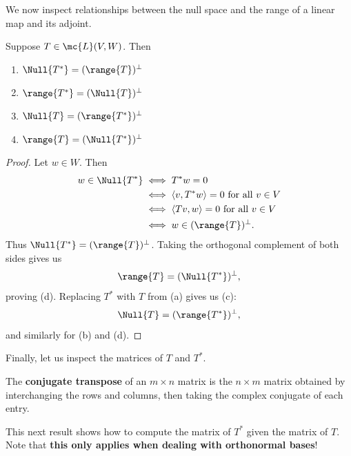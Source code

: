 \documentclass[math0540-lecture-notes.tex]{subfiles}
\begin{document}
We now inspect relationships between the null space and the range of a linear map and its adjoint.
\begin{proposition}{}
  Suppose $T\in \mc{L}(V,W)$. Then
  \begin{enumerate}
    \item $\Null{T^*}=(\range{T})^\bot$
    \item $\range{T^*}=(\Null{T})^\bot$
    \item $\Null{T}=(\range{T^*})^\bot$
    \item $\range{T}=(\Null{T^*})^\bot$
  \end{enumerate}
\end{proposition}
\begin{proof}[Proof]
  Let $w\in W$. Then
  \begin{align*}
    w\in \Null{T^*}&\iff T^*w=0\\
                   &\iff \left<v,T^*w \right> =0 ~\text{for all}~v\in V\\
                   &\iff \left<Tv,w \right> =0~\text{for all}~v\in V\\
                   &\iff w\in (\range{T})^\bot
  .\end{align*}
  Thus $\Null{T^*}=(\range{T})^\bot$. Taking the orthogonal complement of both sides gives us \[
    \range{T}=(\Null{T^*})^\bot
    ,\] proving (d). Replacing $T^*$ with $T$ from (a) gives us (c): \[
    \Null{T}=(\range{T^*})^\bot
  ,\] and similarly for (b) and (d).

\end{proof}

Finally, let us inspect the matrices of $T$ and $T^*$.
\begin{definition}{}
  The \textbf{conjugate transpose} of an $m\times n$ matrix is the $n\times m$ matrix obtained by
  interchanging the rows and columns, then taking the complex conjugate of each entry.
\end{definition}

This next result shows how to compute the matrix of $T^*$ given the matrix of $T$. Note that
\textbf{this only applies when dealing with orthonormal bases}!
\end{document}
